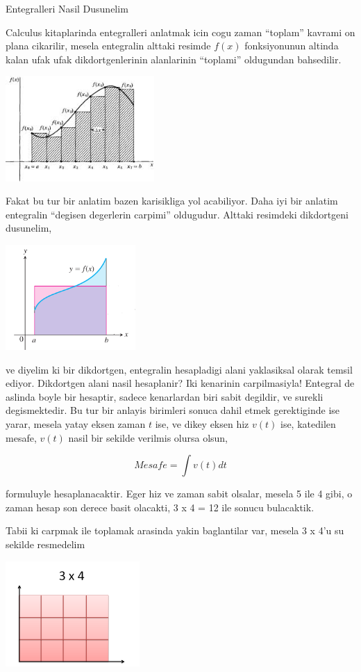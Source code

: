\documentclass[12pt,fleqn]{article}
\begin{document}
Entegralleri Nasil Dusunelim

Calculus kitaplarinda entegralleri anlatmak icin cogu zaman ``toplam''
kavrami on plana cikarilir, mesela entegralin alttaki resimde $f(x)$
fonksiyonunun altinda kalan ufak ufak dikdortgenlerinin alanlarinin
``toplami'' oldugundan bahsedilir.

\includegraphics[height=4cm]{area.png}

Fakat bu tur bir anlatim bazen karisikliga yol acabiliyor. Daha iyi bir
anlatim entegralin ``degisen degerlerin carpimi'' oldugudur. Alttaki
resimdeki dikdortgeni dusunelim, 

\includegraphics[height=4cm]{box.png}

ve diyelim ki bir dikdortgen, entegralin hesapladigi alani yaklasiksal
olarak temsil ediyor. Dikdortgen alani nasil hesaplanir? Iki kenarinin
carpilmasiyla! Entegral de aslinda boyle bir hesaptir, sadece kenarlardan
biri sabit degildir, ve surekli degismektedir. Bu tur bir anlayis birimleri
sonuca dahil etmek gerektiginde ise yarar, mesela yatay eksen zaman $t$
ise, ve dikey eksen hiz $v(t)$ ise, katedilen mesafe, $v(t)$ nasil bir
sekilde verilmis olursa olsun,

\[ Mesafe = \int v(t)dt \]

formuluyle hesaplanacaktir. Eger hiz ve zaman sabit olsalar, mesela 5 ile 4
gibi, o zaman hesap son derece basit olacakti, 3 x 4 = 12 ile sonucu
bulacaktik. 

Tabii ki carpmak ile toplamak arasinda yakin baglantilar var, mesela 3 x
4'u su sekilde resmedelim

\includegraphics[height=4cm]{grid-multiplication.png}
\end{document}
